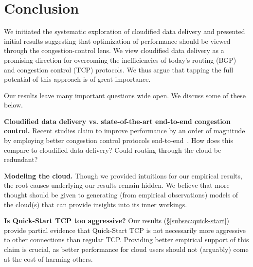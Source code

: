 \documentclass{hotnets17}
\newcommand{\mycomm}[3]{{\color{#2} \textbf{[#1: #3]}}}
\newcommand{\mycomm}[3]{}
\newcommand{\IK}[1]{\mycomm{IK}{blue}{#1}}
\newcommand{\AB}[1]{\mycomm{AB}{Orange}{#1}}
\newcommand{\NR}[1]{\mycomm{NR}{OliveGreen}{#1}}
\newcommand{\T}[1]{\smallskip\noindent\textbf{#1}} %
\begin{document}



\section{Conclusion}

We initiated the systematic exploration of cloudified data delivery and presented initial results suggesting that optimization of performance should be viewed through the congestion-control lens.  We view cloudified data delivery as a promising direction for overcoming the inefficiencies of today's routing (BGP) and congestion control (TCP) protocols. We thus argue that tapping the full potential of this approach is of great importance. 

Our results leave many important questions wide open. We discuss some of these below.

\T{Cloudified data delivery vs. state-of-the-art end-to-end congestion control.} Recent studies claim to improve performance by an order of magnitude by employing better congestion control protocols end-to-end~\cite{PCC}. How does this compare to cloudified data delivery? Could routing through the cloud be redundant?

\T{Modeling the cloud.} Though we provided intuitions for our empirical results, the root causes underlying our results remain hidden. We believe that more thought should be given to generating (from empirical observations) models of the cloud(s) that can provide insights into its inner workings.

\T{Is Quick-Start TCP too aggressive?} Our results (\S\ref{subsec:quick-start}) provide partial evidence that Quick-Start TCP is not necessarily more aggressive to other connections than regular TCP. Providing better empirical support of this claim is crucial, as better performance for cloud users should not (arguably) come at the cost of harming others.

\end{document}
